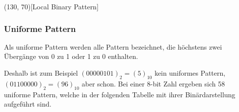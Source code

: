 \documentclass[12pt, a4paper]{article}
\begin{document}
\begin{center}
	\begin{struktogramm}(130, 70)[Local Binary Pattern]
		\assign%
		{
			\begin{declaration}[]
			\end{declaration}
		}
		
		
		\change
		\ifend
		\forallinend
	\end{struktogramm}
\end{center}


\subsubsection{Uniforme Pattern}

Als uniforme Pattern werden alle Pattern bezeichnet, die höchstens zwei Übergänge von 0 zu 1 oder 1 zu 0 enthalten.\cite{wikipedia:lbp}

Deshalb ist zum Beispiel \((00000101)_{2} = (5)_{10}\) kein uniformes Pattern, \((01100000)_{2} = (96)_{10}\) aber schon. Bei einer 8-bit Zahl ergeben sich 58 uniforme Pattern, welche in der folgenden Tabelle mit ihrer Binärdarstellung aufgeführt sind.

\medskip
\end{document}
